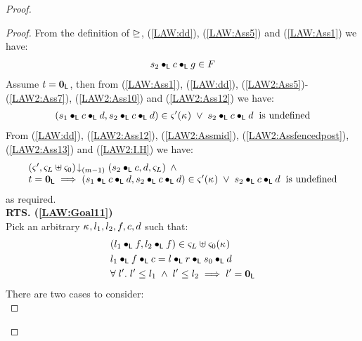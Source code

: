 \begin{lemma}[]
\begin{proof}
\begin{proof}
From the definition of $\unrhd$, (\ref{LAW:dd}), (\ref{LAW:Ass5}) and (\ref{LAW:Ass1}) we have:
%
\begin{align}
	s_2 \bullet_{\textsf{L}} c \bullet_{\textsf{L}} g \in F \label{LAW2:Assfencedpost}
\end{align}
Assume $t = \mathbf{0}_{\textsf{L}}$, then from (\ref{LAW:Ass1}), (\ref{LAW:dd}), (\ref{LAW2:Ass5})-(\ref{LAW2:Ass7}), (\ref{LAW2:Ass10}) and (\ref{LAW2:Ass12}) we have:
%
\begin{align}
	(s_1 \bullet_{\textsf{L}} c \bullet_{\textsf{L}} d, s_2 \bullet_{\textsf{L}} c \bullet_{\textsf{L}} d) \in \varsigma_{}'(\kappa_{}) \;\lor\; s_2 \bullet_{\textsf{L}} c \bullet_{\textsf{L}} d \hspace*{0.2cm} \text{is undefined} \label{LAW2:Ass13}
\end{align}
%
%
From (\ref{LAW:dd}), (\ref{LAW2:Ass12}), (\ref{LAW2:Assmid}), (\ref{LAW2:Assfencedpost}), (\ref{LAW2:Ass13}) and (\ref{LAW2:I.H}) we have:
%
%
\begin{align}
\begin{array}{l}
	\left(\varsigma_{}', \varsigma_{L} \uplus \varsigma_{0}\right) \!\downarrow_{(m-1)} \left(s_2 \bullet_{\textsf{L}} c, d, \varsigma_{L}\right) \;\land \\
	t = \mathbf{0}_{\textsf{L}} \implies (s_1 \bullet_{\textsf{L}} c \bullet_{\textsf{L}} d, s_2 \bullet_{\textsf{L}} c \bullet_{\textsf{L}} d) \in \varsigma_{}'(\kappa_{}) \;\lor\; s_2 \bullet_{\textsf{L}} c \bullet_{\textsf{L}} d \hspace*{0.2cm} \text{is undefined}
\end{array} \nonumber
\end{align}
%
as required.\\

\noindent\textbf{RTS. (\ref{LAW:Goal11})}\\
Pick an arbitrary $\kappa_{}, l_1, l_2, f, c, d$ such that:
%
\begin{align}
	& (l_1 \bullet_{\textsf{L}} f, l_2 \bullet_{\textsf{L}} f) \in \varsigma_{L} \uplus \varsigma_{0}(\kappa_{}) \label{LAW2:Ass16}\\
	& l_1 \bullet_{\textsf{L}} f \bullet_{\textsf{L}} c = l \bullet_{\textsf{L}} r \bullet_{\textsf{L}} s_0 \bullet_{\textsf{L}} d \label{LAW2:Ass17}\\
	& \forall\; l'.\; l' \leq l_1 \;\land\; l' \leq l_2 \implies l' = \mathbf{0}_{\textsf{L}} \label{LAW2:Ass18}
\end{align}
%
There are two cases to consider:\\


\end{proof}
\end{proof}
\end{lemma}
